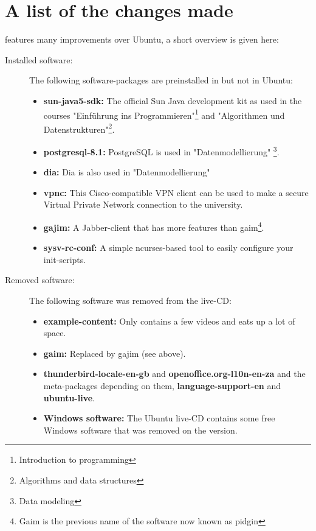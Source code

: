 \section{A list of the changes made}\label{changes-overview}
\tunix{} features many improvements over Ubuntu, a short overview is given here:
\begin{description}
   \item[Installed software:] The following software-packages are preinstalled in \tunix{}
   but not in Ubuntu:
     \begin{itemize}
       \item \textbf{sun-java5-sdk:} The official Sun Java development kit as used in
         the courses "Einführung ins Programmieren"\footnote{Introduction to %
	 programming} and "Algorithmen und Datenstrukturen"\footnote{Algorithms
	 and data structures}.
       \item \textbf{postgresql-8.1:} PostgreSQL is used in "Datenmodellierung"
         \footnote{Data modeling}.
       \item \textbf{dia:} Dia is also used in "Datenmodellierung" 
       \item \textbf{vpnc:} This Cisco-compatible VPN client can be used to make a
         secure Virtual Private Network connection to the university.
       \item \textbf{gajim:} A Jabber-client that has more features than
         gaim\footnote{Gaim is the previous name of the software now known as
         pidgin}.
       \item \textbf{sysv-rc-conf:} A simple ncurses-based tool to easily
         configure your init-scripts.
     \end{itemize}
   \item[Removed software:] The following software was removed from the \tunix{}
   live-CD:
     \begin{itemize}
       \item \textbf{example-content:} Only contains a few videos and eats up a
         lot of space.
       \item \textbf{gaim:} Replaced by gajim (see above).
       \item \textbf{thunderbird-locale-en-gb} and \textbf{openoffice.org-l10n-en-za}
         and the meta-packages depending on them, \textbf{language-support-en} and
	 \textbf{ubuntu-live}.
       \item \textbf{Windows software:} The Ubuntu live-CD contains some free Windows
         software that was removed on the \tunix{} version.

\end{itemize}
\end{description}
